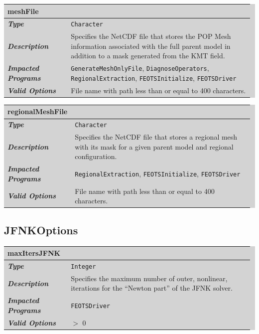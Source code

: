 \documentclass{softwaremanual}
\begin{document}
\noindent\begingroup\setlength{\fboxsep}{0pt}
\colorbox{lightgray}{
\begin{tabular}{p{0.25\linewidth} p{0.725\linewidth}}
\toprule
\textbf{meshFile} & \\
\midrule
\textbf{\textit{Type}} & \texttt{Character} \\
\midrule
\textbf{\textit{Description}} & Specifies the NetCDF file that stores the POP Mesh information associated with the full parent model in addition to a mask generated from the KMT field.  \\
\midrule
\textbf{\textit{Impacted Programs}} & \texttt{GenerateMeshOnlyFile}, \texttt{DiagnoseOperators}, \texttt{RegionalExtraction}, \texttt{FEOTSInitialize}, \texttt{FEOTSDriver} \\
\midrule
\textbf{\textit{Valid Options}}  & File name with path less than or equal to 400 characters. \\
\bottomrule
\end{tabular}
}\endgroup

\noindent\begingroup\setlength{\fboxsep}{0pt}
\colorbox{lightgray}{
\begin{tabular}{p{0.25\linewidth} p{0.725\linewidth}}
\toprule
\textbf{regionalMeshFile} & \\
\midrule
\textbf{\textit{Type}} & \texttt{Character} \\
\midrule
\textbf{\textit{Description}} & Specifies the NetCDF file that stores a regional mesh with its mask for a given parent model and regional configuration. \\
\midrule
\textbf{\textit{Impacted Programs}} & \texttt{RegionalExtraction}, \texttt{FEOTSInitialize}, \texttt{FEOTSDriver} \\
\midrule
\textbf{\textit{Valid Options}}  & File name with path less than or equal to 400 characters. \\
\bottomrule
\end{tabular}
}\endgroup

\subsection{JFNKOptions}

\noindent\begingroup\setlength{\fboxsep}{0pt}
\colorbox{lightgray}{
\begin{tabular}{p{0.25\linewidth} p{0.725\linewidth}}
\toprule
\textbf{maxItersJFNK} & \\
\midrule
\textbf{\textit{Type}} & \texttt{Integer} \\
\midrule
\textbf{\textit{Description}} & Specifies the maximum number of outer, nonlinear, iterations for the ``Newton part'' of the JFNK solver. \\
\midrule
\textbf{\textit{Impacted Programs}} & \texttt{FEOTSDriver} \\
\midrule
\textbf{\textit{Valid Options}}  & $>$ 0\\
\bottomrule
\end{tabular}
}\endgroup
\end{document}
